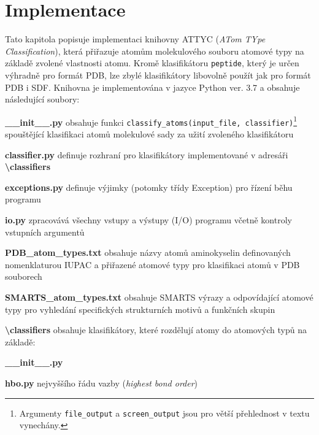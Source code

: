 \chapter{Implementace}
Tato kapitola popisuje implementaci knihovny ATTYC (\textit{ATom TYpe Classification}), která přiřazuje atomům molekulového souboru atomové typy na základě zvolené vlastnosti atomu. Kromě klasifikátoru \verb|peptide|, který je určen výhradně pro formát PDB, lze zbylé klasifikátory libovolně použít jak pro formát PDB i SDF. Knihovna je implementována v jazyce Python ver. 3.7 a obsahuje následující soubory:

\vspace{0.4cm}
\noindent {} \textbf{\_\_init\_\_.py} obsahuje funkci \verb|classify_atoms(input_file, classifier)|\footnote{Argumenty \texttt{file\_output} a \texttt{screen\_output} jsou pro větší přehlednost v textu vynechány.}
spouštějící klasifikaci atomů molekulové sady za uži\-tí zvoleného klasifikátoru

\medskip
\noindent \textbf{classifier.py} definuje rozhraní pro klasifikátory implementované v adresáři \textbf{\textbackslash classifiers}

\medskip
\noindent \textbf{exceptions.py} definuje výjimky (potomky třídy Exception) pro řízení běhu programu

\medskip
\noindent {}\textbf{io.py} zpracovává všechny vstupy a výstupy (I/O) programu včetně kontroly vstupních argumentů 

\medskip
\noindent {}\textbf{PDB\_atom\_types.txt} obsahuje názvy atomů aminokyselin definovaných nomenklaturou IUPAC a přiřazené atomové typy pro klasifikaci atomů v PDB souborech

\medskip
\noindent {}\textbf{SMARTS\_atom\_types.txt} obsahuje SMARTS výrazy a odpovídající atomové typy pro vyhledání specifických strukturních motivů a funkčních skupin 

\medskip
\noindent\textbf{\textbackslash classifiers} obsahuje klasifikátory, které rozdělují atomy do atomových typů na základě:

\medskip
\textbf{\_\_init\_\_.py}

\vspace{0.01cm}
\textbf{hbo.py} nejvyššího řádu vazby (\textit{highest bond order})

